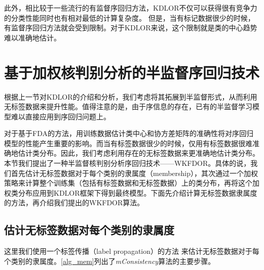 此外，相比较于一些流行的有监督序回归方法，KDLOR不仅可以获得很有竞争力的分类性能同时也有相对最低的计算复杂度\citep{sun2010kernel}。
但是，当有标记数据很少的时候，有监督序回归方法就会受到限制。对于KDLOR来说，这个限制就是类的中心趋势难以准确地估计。

\section{基于加权核判别分析的半监督序回归技术}

根据上一节对KDLOR的介绍和分析，我们考虑将其拓展到半监督形式，从而利用无标签数据来提升性能。值得注意的是，由于序信息的存在，已有的半监督学习模型难以直接应用到序回归问题上。

对于基于FDA的方法，用训练数据估计类中心和协方差矩阵的准确性将对序回归模型的性能产生重要的影响。而当有标签数据很少的时候，仅用有标签数据很难准确地估计类分布。因此，我们考虑利用存在的无标签数据来更准确地估计类分布。本节我们提出了一种半监督核判别分析序回归技术——WKFDOR。具体的说，我们首先估计无标签数据对于每个类别的隶属度（membership），其次通过一个加权策略来计算整个训练集（包括有标签数据和无标签数据）上的类分布，再将这个加权类分布应用到KDLOR框架下得到最终模型。下面先介绍计算无标签数据隶属度的方法，再介绍我们提出的WKFDOR算法。

\subsection{估计无标签数据对每个类别的隶属度}
这里我们使用一个标签传播（label propagation）的方法\citep{zhou2004learning}
来估计无标签数据对于每个类别的隶属度。\autoref{alg_mem}列出了\textit{mConsistency}算法的主要步骤。

